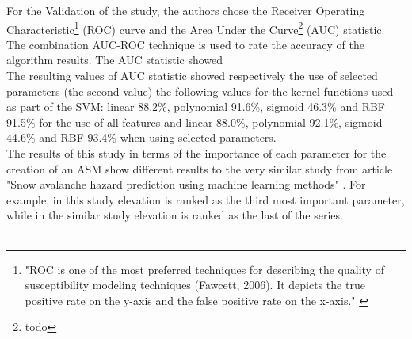 \documentclass[../masterarbeit.tex]{subfiles}
\begin{document}
For the Validation of the study, the authors chose the Receiver Operating Characteristic\footnote{"ROC is one of the most preferred techniques for describing the quality of susceptibility modeling techniques (Fawcett, 2006). It depicts the true positive rate on the y-axis and the false positive rate on the x-axis." \autocite[]{Tiwari:2021}} (ROC) curve and the Area Under the Curve\footnote{todo} (AUC) statistic. The combination AUC-ROC technique is used to rate the accuracy of the algorithm results. The AUC statistic showed \autocite[]{Tiwari:2021} \\
The resulting values of AUC statistic showed respectively the use of selected parameters (the second value) the following values for the kernel functions used as part of the SVM: linear 88.2\%, polynomial 91.6\%, sigmoid 46.3\% and RBF 91.5\% for the use of all features and linear 88.0\%, polynomial 92.1\%, sigmoid 44.6\% and RBF 93.4\% when using selected parameters. \\
The results of this study in terms of the importance of each parameter for the creation of an ASM show different results to the very similar study from article "Snow avalanche hazard prediction using machine learning methods" \textcite[]{Bahram:2019}. For example, in this study elevation is ranked as the third most important parameter, while in the similar study elevation is ranked as the last of the series.  \autocite[]{Tiwari:2021} \autocite[]{Bahram:2019} \\~\\
\end{document}
